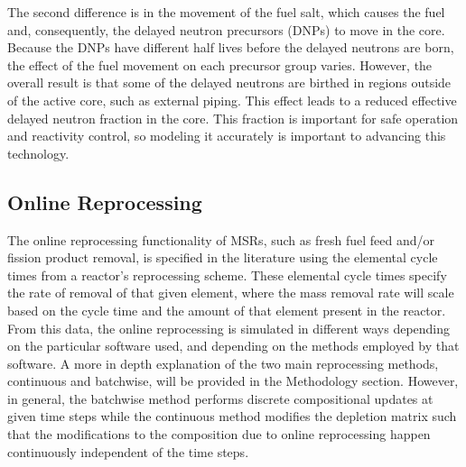 The second difference is in the movement of the fuel salt, which causes the fuel and, consequently, the delayed neutron precursors (DNPs) to move in the core. Because the DNPs have different half lives before the delayed neutrons are born, the effect of the fuel movement on each precursor group varies.
However, the overall result is that some of the delayed neutrons are birthed in regions outside of the active core, such as external piping.
This effect leads to a reduced effective delayed neutron fraction in the core.
This fraction is important for safe operation and reactivity control, so modeling it accurately is important to advancing this technology.

\subsection{Online Reprocessing}

The online reprocessing functionality of MSRs, such as fresh fuel feed and/or fission product removal, is specified in the literature using the elemental cycle times from a reactor's reprocessing scheme. These elemental cycle times specify the rate of removal of that given element, where the mass removal rate will scale based on the cycle time and the amount of that element present in the reactor.
From this data, the online reprocessing is simulated in different ways depending on the particular software used, and depending on the methods employed by that software.
A more in depth explanation of the two main reprocessing methods, continuous and batchwise, will be provided in the Methodology section.
However, in general, the batchwise method performs discrete compositional updates at given time steps while the continuous method modifies the depletion matrix such that the modifications to the composition due to online reprocessing happen continuously independent of the time steps. 


